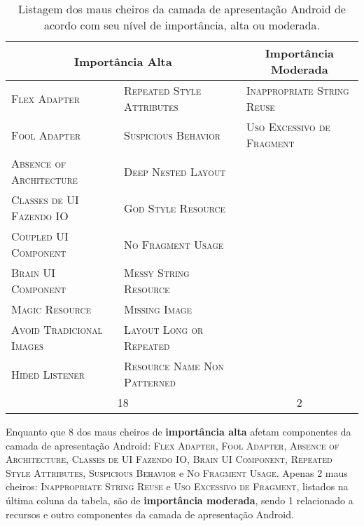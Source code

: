 \begin{table}[!htb]
\centering
\renewcommand*{\arraystretch}{1}
\footnotesize
\caption{Listagem dos maus cheiros da camada de apresentação Android de acordo com seu nível de importância, alta ou moderada.}
\begin{tabular}{@{}p{5.2cm}p{5.2cm}p{5.2cm}@{}}
\toprule
\multicolumn{2}{c}{\textbf{Importância Alta}} & \multicolumn{1}{c}{\textbf{Importância Moderada}}  \\
\bottomrule
\textsc{\scriptsize Flex Adapter}              & \textsc{\scriptsize Repeated Style Attributes} & \textsc{\scriptsize Inappropriate String Reuse} \\
\textsc{\scriptsize Fool Adapter}            & \textsc{\scriptsize Suspicious Behavior}        & \textsc{\scriptsize Uso Excessivo de Fragment} \\
\textsc{\scriptsize Absence of Architecture}       & \textsc{\scriptsize Deep Nested Layout} \\
\textsc{\scriptsize Classes de UI Fazendo IO}      & \textsc{\scriptsize God Style Resource}       \\
\textsc{\scriptsize Coupled UI Component}     & \textsc{\scriptsize No Fragment Usage}           \\
\textsc{\scriptsize Brain UI Component}      & \textsc{\scriptsize Messy String Resource}   \\
\textsc{\scriptsize Magic Resource}                & \textsc{\scriptsize Missing Image}               \\
\textsc{\scriptsize Avoid Tradicional Images}& \textsc{\scriptsize Layout Long or Repeated}      \\
\textsc{\scriptsize Hided Listener}            & \textsc{\scriptsize Resource Name Non Patterned}\\
\toprule
\multicolumn{2}{c}{18} & \multicolumn{1}{c}{2}  \\
\bottomrule
\end{tabular}
\label{tab:SmellImportance}
\end{table}

Enquanto que 8 dos maus cheiros de \textbf{\small importância alta} afetam componentes da camada de apresentação Android: \textsc{\small Flex Adapter}, \textsc{\small Fool Adapter}, \textsc{\small Absence of Architecture}, \textsc{\small Classes de UI Fazendo IO}, \textsc{\small Brain UI Component}, \textsc{\small Repeated Style Attributes}, \textsc{\small Suspicious Behavior} e \textsc{\small No Fragment Usage}. Apenas 2 maus cheiros: \textsc{\small Inappropriate String Reuse} e \textsc{\small Uso Excessivo de Fragment}, listados na última coluna da tabela, são de \textbf{\small importância moderada}, sendo 1 relacionado a recursos e outro componentes da camada de apresentação Android.


